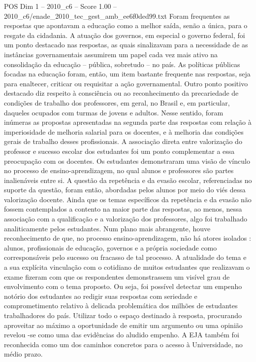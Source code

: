 \begin{textsample}{POS Dim 1 – 2010\_c6 – Score 1.00 – 2010\_c6/enade\_2010\_tec\_gest\_amb\_ee6f0ded99.txt}
Foram frequentes as respostas que apontavam a educação como a melhor saída, senão a única, para o resgate da cidadania.
A atuação dos governos, em especial o governo federal, foi um ponto destacado nas respostas, as quais sinalizavam para a necessidade de as instâncias governamentais assumirem um papel cada vez mais ativo na consolidação da educação – pública, sobretudo – no país.
As políticas públicas focadas na educação foram, então, um item bastante frequente nas respostas, seja para enaltecer, criticar ou requisitar a ação governamental.
Outro ponto positivo destacado diz respeito à consciência ou ao reconhecimento da precariedade de condições de trabalho dos professores, em geral, no Brasil e, em particular, daqueles ocupados com turmas de jovens e adultos.
Nesse sentido, foram inúmeras as propostas apresentadas na segunda parte das respostas com relação à imperiosidade de melhoria salarial para os docentes, e à melhoria das condições gerais de trabalho desses profissionais.
A associação direta entre valorização do professor e sucesso escolar dos estudantes foi um ponto complementar a essa preocupação com os docentes.
Os estudantes demonstraram uma visão de vínculo no processo de ensino-aprendizagem, no qual alunos e professores são partes inalienáveis entre si.
A questão da repetência e da evasão escolar, referenciadas no suporte da questão, foram então, abordadas pelos alunos por meio do viés dessa valorização docente.
Ainda que os temas específicos da repetência e da evasão não fossem contemplados a contento na maior parte das respostas, ao menos, nessa associação com a qualificação e a valorização dos professores, algo foi trabalhado analiticamente pelos estudantes.
Num plano mais abrangente, houve reconhecimento de que, no processo ensino-aprendizagem, não há atores isolados : alunos, profissionais de educação, governos e a própria sociedade como corresponsáveis pelo sucesso ou fracasso de tal processo.
A atualidade do tema e a sua explícita vinculação com o cotidiano de muitos estudantes que realizavam o exame fizeram com que os respondentes demonstrassem um visível grau de envolvimento com o tema proposto.
Ou seja, foi possível detectar um empenho notório dos estudantes ao redigir suas respostas com seriedade e comprometimento relativo à delicada problemática dos milhões de estudantes trabalhadores do país.
Utilizar todo o espaço destinado à resposta, procurando aproveitar ao máximo a oportunidade de emitir um argumento ou uma opinião revelou -se como uma das evidências do aludido empenho.
A EJA também foi reconhecida como um dos caminhos concretos para o acesso à Universidade, no médio prazo.

\end{textsample}
